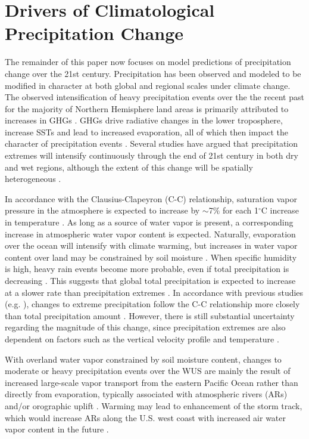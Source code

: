 \documentclass{ametsoc}
\begin{document}
\section{Drivers of Climatological Precipitation Change} \label{sec:ChangeDrivers}

The remainder of this paper now focuses on model predictions of precipitation change over the 21st century.  Precipitation has been observed and modeled to be modified in character at both global and regional scales under climate change. The observed intensification of heavy precipitation events over the the recent past for the majority of Northern Hemisphere land areas is primarily attributed to increases in GHGs \citep{min2011human}.  GHGs drive radiative changes in the lower troposphere, increase SSTs and lead to increased evaporation, all of which then impact the character of precipitation events \citep{allen2002constraints, sugi2004mechanism}. Several studies have argued that precipitation extremes will intensify continuously through the end of 21st century in both dry and wet regions, although the extent of this change will be spatially heterogeneous \citep{donat2016more}.


In accordance with the Clausius-Clapeyron (C-C) relationship, saturation vapor pressure in the atmosphere is expected to increase by $\sim$7$\%$ for each 1$^\circ$C increase in temperature \citep{allan2008atmospheric}.  As long as a source of water vapor is present, a corresponding increase in atmospheric water vapor content is expected.  Naturally, evaporation over the ocean will intensify with climate warming, but increases in water vapor content over land may be constrained by soil moisture \citep{cayan2010future}. When specific humidity is high, heavy rain events become more probable, even if total precipitation is decreasing \citep{allen2002constraints, trenberth2011changes}.  This suggests that global total precipitation is expected to increase at a slower rate than precipitation extremes \citep{allan2008atmospheric}. In accordance with previous studies (e.g. \cite{allan2008atmospheric, o2009physical, min2011human}), changes to extreme precipitation follow the C-C relationship more closely than total precipitation amount \citep{trenberth2003changing}. However, there is still substantial uncertainty regarding the magnitude of this change, since precipitation extremes are also dependent on factors such as the vertical velocity profile and temperature \citep{o2009physical}.

With overland water vapor constrained by soil moisture content, changes to moderate or heavy precipitation events over the WUS are mainly the result of increased large-scale vapor transport from the eastern Pacific Ocean rather than directly from evaporation, typically associated with atmospheric rivers (ARs) and/or orographic uplift \citep{trenberth2003changing, neiman2008meteorological}. Warming may lead to enhancement of the storm track, which would increase ARs along the U.S. west coast with increased air water vapor content in the future \citep{dettinger2011climate, gao2015dynamical}.
\end{document}
